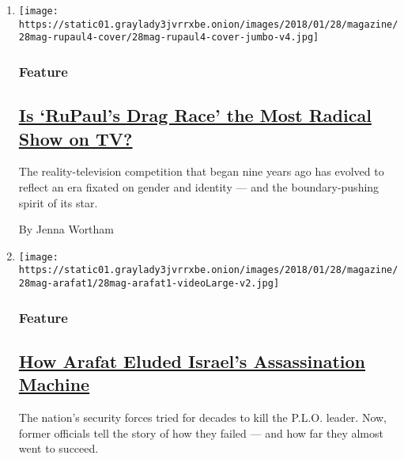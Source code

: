 \begin{enumerate}
\def\labelenumi{\arabic{enumi}.}
\item
  \texttt{[image: https://static01.graylady3jvrrxbe.onion/images/2018/01/28/magazine/28mag-rupaul4-cover/28mag-rupaul4-cover-jumbo-v4.jpg]}

  \hypertarget{feature}{%
  \subsubsection{Feature}\label{feature}}

  \hypertarget{is-rupauls-drag-race-the-most-radical-show-on-tv}{%
  \subsection{\texorpdfstring{\href{/2018/01/24/magazine/is-rupauls-drag-race-the-most-radical-show-on-tv.html}{Is
  `RuPaul's Drag Race' the Most Radical Show on
  TV?}}{Is `RuPaul's Drag Race' the Most Radical Show on TV?}}\label{is-rupauls-drag-race-the-most-radical-show-on-tv}}

  The reality-television competition that began nine years ago has
  evolved to reflect an era fixated on gender and identity --- and the
  boundary-pushing spirit of its star.

  By Jenna Wortham
\item
  \texttt{[image: https://static01.graylady3jvrrxbe.onion/images/2018/01/28/magazine/28mag-arafat1/28mag-arafat1-videoLarge-v2.jpg]}

  \hypertarget{feature-1}{%
  \subsubsection{Feature}\label{feature-1}}

  \hypertarget{how-arafat-eluded-israels-assassination-machine}{%
  \subsection{\texorpdfstring{\href{/2018/01/23/magazine/how-arafat-eluded-israels-assassination-machine.html}{How
  Arafat Eluded Israel's Assassination
  Machine}}{How Arafat Eluded Israel's Assassination Machine}}\label{how-arafat-eluded-israels-assassination-machine}}

  The nation's security forces tried for decades to kill the P.L.O.
  leader. Now, former officials tell the story of how they failed ---
  and how far they almost went to succeed.


\end{enumerate}
